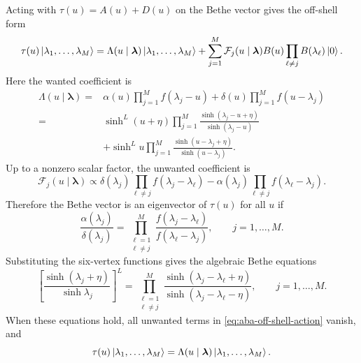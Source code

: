 Acting with $\tau(u)=A(u)+D(u)$ on the Bethe vector gives the off-shell form
\begin{equation}
\label{eq:aba-off-shell-action}
    \tau(u)\left|\lambda_1,
\ldots,\lambda_M\right\rangle
    =
    \Lambda(u\mid\boldsymbol{\lambda})
    \left|\lambda_1,
\ldots,\lambda_M\right\rangle
    +
    \sum_{j=1}^{M}
    \mathcal{F}_j(u\mid\boldsymbol{\lambda})
    B(u)\prod_{\ell\neq j}B(\lambda_\ell)\left|0\right\rangle .
\end{equation}
Here the wanted coefficient is
\begin{equation}
\label{eq:aba-transfer-eigenvalue}
\boxed{
\begin{aligned}
    \Lambda(u\mid\boldsymbol{\lambda})
    ={}&
    \alpha(u)
    \prod_{j=1}^{M}f(\lambda_j-u)
    +
    \delta(u)
    \prod_{j=1}^{M}f(u-\lambda_j)
    \\
    ={}&
    \sinh^L(u+\eta)
    \prod_{j=1}^{M}
    \frac{\sinh(\lambda_j-u+\eta)}{\sinh(\lambda_j-u)}
    \\
    &+
    \sinh^L u
    \prod_{j=1}^{M}
    \frac{\sinh(u-\lambda_j+\eta)}{\sinh(u-\lambda_j)} .
\end{aligned}}
\end{equation}
Up to a nonzero scalar factor, the unwanted coefficient is
\begin{equation}
\label{eq:aba-unwanted-coefficient}
    \mathcal{F}_j(u\mid\boldsymbol{\lambda})
    \propto
    \delta(\lambda_j)
    \prod_{\ell\neq j}f(\lambda_j-\lambda_\ell)
    -
    \alpha(\lambda_j)
    \prod_{\ell\neq j}f(\lambda_\ell-\lambda_j) .
\end{equation}
Therefore the Bethe vector is an eigenvector of $\tau(u)$ for all $u$ if
\begin{equation}
\label{eq:aba-bethe-equations-abstract}
    \frac{\alpha(\lambda_j)}{\delta(\lambda_j)}
    =
    \prod_{\substack{\ell=1\\ \ell\neq j}}^{M}
    \frac{f(\lambda_j-\lambda_\ell)}{f(\lambda_\ell-\lambda_j)},
    \qquad
    j=1,
\ldots,M .
\end{equation}
Substituting the six-vertex functions gives the algebraic Bethe equations
\begin{equation}
\label{eq:aba-xxz-bethe-equations}
\boxed{
    \left[
    \frac{\sinh(\lambda_j+\eta)}{\sinh\lambda_j}
    \right]^L
    =
    \prod_{\substack{\ell=1\\ \ell\neq j}}^{M}
    \frac{\sinh(\lambda_j-\lambda_\ell+\eta)}
         {\sinh(\lambda_j-\lambda_\ell-\eta)} ,
    \qquad
    j=1,
\ldots,M .
}
\end{equation}
When these equations hold, all unwanted terms in \cref{eq:aba-off-shell-action}
vanish, and
\begin{equation}
\label{eq:aba-on-shell-transfer-action}
    \tau(u)\left|\lambda_1,
\ldots,\lambda_M\right\rangle
    =
    \Lambda(u\mid\boldsymbol{\lambda})
    \left|\lambda_1,
\ldots,\lambda_M\right\rangle .
\end{equation}

